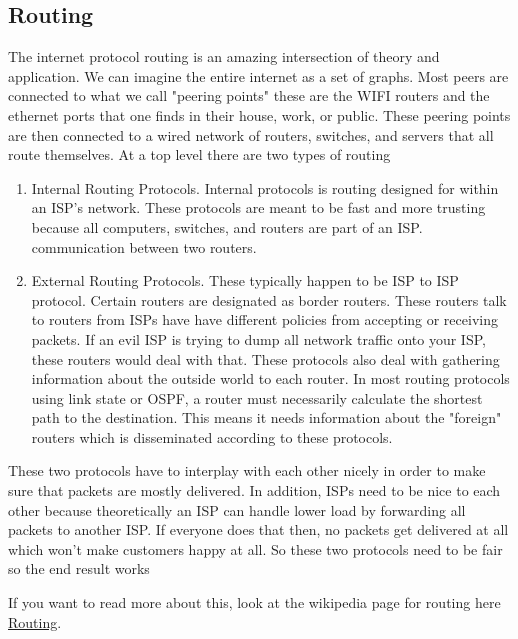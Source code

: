 \begin{aside}

\subsection{Routing}

The internet protocol routing is an amazing intersection of theory and application. We can imagine the entire internet as a set of graphs. Most peers are connected to what we call "peering points" these are the WIFI routers and the ethernet ports that one finds in their house, work, or public. These peering points are then connected to a wired network of routers, switches, and servers that all route themselves. At a top level there are two types of routing

\begin{enumerate}
  \item Internal Routing Protocols. Internal protocols is routing designed for within an ISP's network. These protocols are meant to be fast and more trusting because all computers, switches, and routers are part of an ISP. communication between two routers.
  \item External Routing Protocols. These typically happen to be ISP to ISP protocol. Certain routers are designated as border routers. These routers talk to routers from ISPs have have different policies from accepting or receiving packets. If an evil ISP is trying to dump all network traffic onto your ISP, these routers would deal with that. These protocols also deal with gathering information about the outside world to each router. In most routing protocols using link state or OSPF, a router must necessarily calculate the shortest path to the destination. This means it needs information about the "foreign" routers which is disseminated according to these protocols.
\end{enumerate}

These two protocols have to interplay with each other nicely in order to make sure that packets are mostly delivered. In addition, ISPs need to be nice to each other because theoretically an ISP can handle lower load by forwarding all packets to another ISP. If everyone does that then, no packets get delivered at all which won't make customers happy at all. So these two protocols need to be fair so the end result works

If you want to read more about this, look at the wikipedia page for routing here \href{https://en.wikipedia.org/wiki/Routing}{Routing}.


\end{aside}
